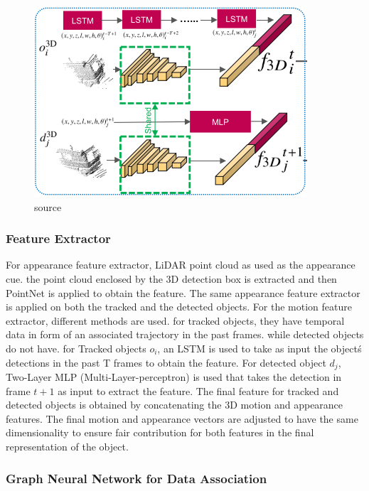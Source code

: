 \documentclass[10pt,twocolumn,letterpaper]{article}
\begin{document}
\begin{figure}
	\includegraphics[width=\linewidth]{media/tracking_net.png}
   \caption{source \cite{weng2020gnn3dmot}}
\label{fig:tracking_feature_ext}
\end{figure}

\subsubsection{Feature Extractor}

For appearance feature extractor, LiDAR point cloud as used as the appearance cue. the point cloud enclosed by the 3D detection box is extracted and then PointNet \cite{qi2017pointnet} is applied to obtain the feature. The same appearance feature extractor is applied on both the tracked and the detected objects. For the motion feature extractor, different methods are used. for tracked objects, they have temporal data in form of an associated trajectory in the past frames. while detected objects do not have. for Tracked objects $o_{i}$, an LSTM is used to take as input the object\'s detections in the past T frames to obtain the feature. For detected object $d_{j}$, Two-Layer MLP (Multi-Layer-perceptron) is used that takes the detection in frame $t+1$ as input to extract the feature. The final feature for tracked and detected objects is obtained by concatenating the 3D motion and appearance features. The final motion and appearance vectors are adjusted to have the same dimensionality to ensure fair contribution for both features in the final representation of the object.



\subsubsection{Graph Neural Network for Data Association}
\end{document}
